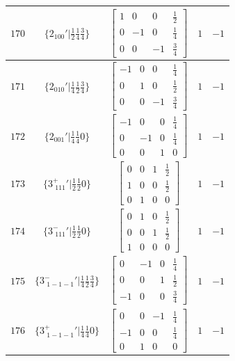 \documentclass[fleqn,8pt]{jsarticle}
\begin{document}
\begin{longtable}{ccccc}
$ 170 $ & $ \{2{}_{100}{}'|\frac{1}{2} \frac{1}{4} \frac{3}{4}\} $ & $ \begin{bmatrix} 1 & 0 & 0 & \frac{1}{2} \\ 0 & -1 & 0 & \frac{1}{4} \\ 0 & 0 & -1 & \frac{3}{4} \end{bmatrix} $ & $ 1 $ & $ -1 $ \\ \hline
$ 171 $ & $ \{2{}_{010}{}'|\frac{1}{4} \frac{1}{2} \frac{3}{4}\} $ & $ \begin{bmatrix} -1 & 0 & 0 & \frac{1}{4} \\ 0 & 1 & 0 & \frac{1}{2} \\ 0 & 0 & -1 & \frac{3}{4} \end{bmatrix} $ & $ 1 $ & $ -1 $ \\ \hline
$ 172 $ & $ \{2{}_{001}{}'|\frac{1}{4} \frac{1}{4} 0\} $ & $ \begin{bmatrix} -1 & 0 & 0 & \frac{1}{4} \\ 0 & -1 & 0 & \frac{1}{4} \\ 0 & 0 & 1 & 0 \end{bmatrix} $ & $ 1 $ & $ -1 $ \\ \hline
$ 173 $ & $ \{3^{+}_{\,\,111}{}'|\frac{1}{2} \frac{1}{2} 0\} $ & $ \begin{bmatrix} 0 & 0 & 1 & \frac{1}{2} \\ 1 & 0 & 0 & \frac{1}{2} \\ 0 & 1 & 0 & 0 \end{bmatrix} $ & $ 1 $ & $ -1 $ \\ \hline
$ 174 $ & $ \{3^{-}_{\,\,111}{}'|\frac{1}{2} \frac{1}{2} 0\} $ & $ \begin{bmatrix} 0 & 1 & 0 & \frac{1}{2} \\ 0 & 0 & 1 & \frac{1}{2} \\ 1 & 0 & 0 & 0 \end{bmatrix} $ & $ 1 $ & $ -1 $ \\ \hline
$ 175 $ & $ \{3^{-}_{\,\,1-1-1}{}'|\frac{1}{4} \frac{1}{2} \frac{3}{4}\} $ & $ \begin{bmatrix} 0 & -1 & 0 & \frac{1}{4} \\ 0 & 0 & 1 & \frac{1}{2} \\ -1 & 0 & 0 & \frac{3}{4} \end{bmatrix} $ & $ 1 $ & $ -1 $ \\ \hline
$ 176 $ & $ \{3^{+}_{\,\,1-1-1}{}'|\frac{1}{4} \frac{1}{4} 0\} $ & $ \begin{bmatrix} 0 & 0 & -1 & \frac{1}{4} \\ -1 & 0 & 0 & \frac{1}{4} \\ 0 & 1 & 0 & 0 \end{bmatrix} $ & $ 1 $ & $ -1 $ \\ \hline

\end{longtable}
\end{document}
